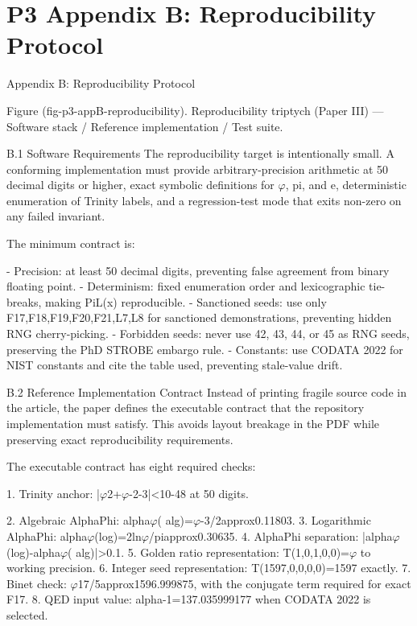 
\section{P3 Appendix B: Reproducibility Protocol}

Appendix B: Reproducibility Protocol

         Figure (fig-p3-appB-reproducibility). Reproducibility triptych (Paper III) --- Software stack /
                                  Reference implementation / Test suite.

  B.1 Software Requirements
  The reproducibility target is intentionally small. A conforming implementation must
  provide arbitrary-precision arithmetic at 50 decimal digits or higher, exact symbolic
  definitions for $\varphi$, pi, and e, deterministic enumeration of Trinity labels, and a
  regression-test mode that exits non-zero on any failed invariant.

  The minimum contract is:

  - Precision: at least 50 decimal digits, preventing false agreement from binary floating
  point.
  - Determinism: fixed enumeration order and lexicographic tie-breaks, making PiL(x)
  reproducible.
  - Sanctioned seeds: use only F17,F18,F19,F20,F21,L7,L8                              for   sanctioned
  demonstrations, preventing hidden RNG cherry-picking.
  - Forbidden seeds: never use 42, 43, 44, or 45 as RNG seeds, preserving the PhD
  STROBE embargo rule.
  - Constants: use CODATA 2022 for NIST constants and cite the table used, preventing
  stale-value drift.

  B.2 Reference Implementation Contract
  Instead of printing fragile source code in the article, the paper defines the executable
  contract that the repository implementation must satisfy. This avoids layout breakage in
  the PDF while preserving exact reproducibility requirements.

  The executable contract has eight required checks:

  1. Trinity anchor: |$\varphi$2+$\varphi$-2-3|<10-48 at 50 digits.

  2. Algebraic AlphaPhi: alpha$\varphi$( alg)=$\varphi$-3/2approx0.11803.
  3. Logarithmic AlphaPhi: alpha$\varphi$(log)=2ln$\varphi$/piapprox0.30635.
  4. AlphaPhi separation: |alpha$\varphi$(log)-alpha$\varphi$( alg)|>0.1.
  5. Golden ratio representation: T(1,0,1,0,0)=$\varphi$ to working precision.
  6. Integer seed representation: T(1597,0,0,0,0)=1597 exactly.
  7. Binet check: $\varphi$17/5approx1596.999875, with the conjugate term required for exact
  F17.
  8. QED input value: alpha-1=137.035999177 when CODATA 2022 is selected.

